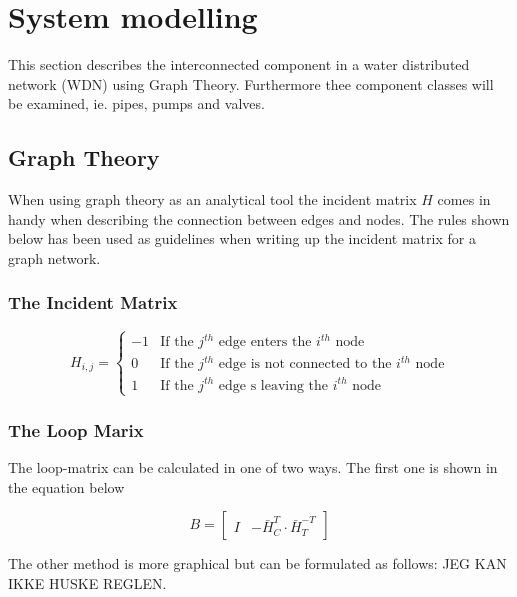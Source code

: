 \section{System modelling }
This section describes the interconnected component in a water distributed network (WDN) using Graph Theory. Furthermore thee component classes will be examined, ie. pipes, pumps and valves.


\subsection{Graph Theory}
When using graph theory as an analytical tool the incident matrix $H$ comes in handy when describing the connection between edges and nodes. The rules shown below has been used as guidelines when writing up the incident matrix for a graph network. 

\subsubsection{The Incident Matrix}
\begin{equation*}
	H_{i,j} = \begin{cases}
		-1 & \text{If the $j^{th}$ edge enters the $i^{th}$ node} \\
		0 & \text{If the $j^{th}$ edge is not connected to the $i^{th}$ node} \\
		1 & \text{If the $j^{th}$ edge s leaving the $i^{th}$ node}
	\end{cases}
\end{equation*} %

\subsubsection{The Loop Marix}
The loop-matrix can be calculated in one of two ways. The first one is shown in the equation below

\begin{equation} \label{Bmatrix}
	B = \begin{bmatrix}
		I & -\bar{H}_{C}^{T}\cdot\bar{H}_{T}^{-T}
	\end{bmatrix}
\end{equation}


The other method is more graphical but can be formulated as follows: JEG KAN IKKE HUSKE REGLEN.

\newpage
